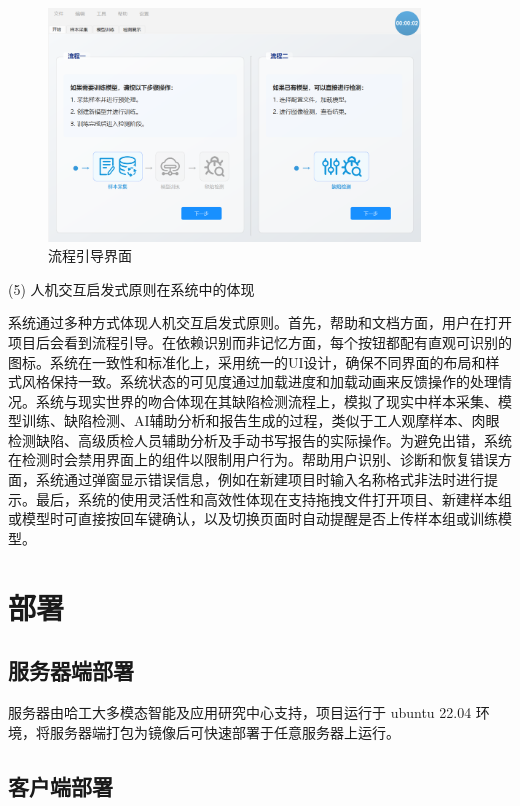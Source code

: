 \documentclass[
  ]{njuthesis}
\begin{document}
\begin{figure}[htb]
    \centering
    \includegraphics[width=0.88\textwidth]{images/流程引导界面.png}
    \caption{流程引导界面}
    \label{流程引导界面}
\end{figure}

(5) 人机交互启发式原则在系统中的体现

系统通过多种方式体现人机交互启发式原则。首先，帮助和文档方面，用户在打开项目后会看到流程引导。在依赖识别而非记忆方面，每个按钮都配有直观可识别的图标。系统在一致性和标准化上，采用统一的UI设计，确保不同界面的布局和样式风格保持一致。系统状态的可见度通过加载进度和加载动画来反馈操作的处理情况。系统与现实世界的吻合体现在其缺陷检测流程上，模拟了现实中样本采集、模型训练、缺陷检测、AI辅助分析和报告生成的过程，类似于工人观摩样本、肉眼检测缺陷、高级质检人员辅助分析及手动书写报告的实际操作。为避免出错，系统在检测时会禁用界面上的组件以限制用户行为。帮助用户识别、诊断和恢复错误方面，系统通过弹窗显示错误信息，例如在新建项目时输入名称格式非法时进行提示。最后，系统的使用灵活性和高效性体现在支持拖拽文件打开项目、新建样本组或模型时可直接按回车键确认，以及切换页面时自动提醒是否上传样本组或训练模型。


\section{部署}

\subsection{服务器端部署}

服务器由哈工大多模态智能及应用研究中心支持，项目运行于 ubuntu 22.04 环境，将服务器端打包为镜像后可快速部署于任意服务器上运行。

\subsection{客户端部署}
\end{document}

